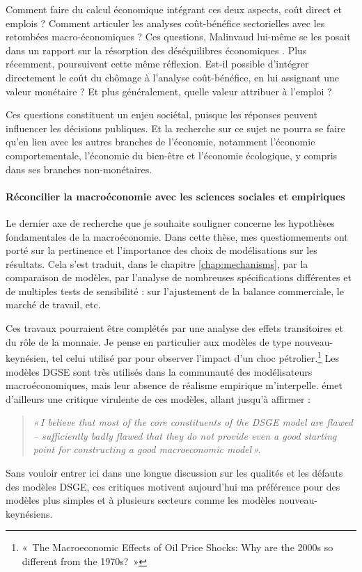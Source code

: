Comment faire du calcul économique intégrant ces deux aspects, coût direct et emplois ? Comment articuler les analyses coût-bénéfice sectorielles avec les retombées macro-économiques ?
Ces questions, Malinvaud lui-même se les posait dans un rapport sur la résorption des déséquilibres économiques \citep{CommissariatgeneralduPlan1984}. Plus récemment, \citet{Masur2011, Masur2012} poursuivent cette même réflexion.
Est-il possible d'intégrer directement le coût du chômage à l'analyse coût-bénéfice, en lui assignant une valeur monétaire ? Et plus généralement, quelle valeur attribuer à l'emploi ? 

Ces questions constituent un enjeu sociétal, puisque les réponses peuvent influencer les décisions publiques. Et la recherche sur ce sujet ne pourra se faire qu'en lien avec les autres branches de l'économie, notamment l'économie comportementale, l'économie du bien-être et l'économie écologique, y compris dans ses branches non-monétaires.

\paragraph{Réconcilier la macroéconomie avec les sciences sociales et empiriques} \hfill

Le dernier axe de recherche que je souhaite souligner concerne les hypothèses fondamentales de la macroéconomie.
Dans cette thèse, mes questionnements ont porté sur la pertinence et l’importance des choix de modélisations sur les résultats. Cela s’est traduit, dans le chapitre \ref{chap:mechanisms}, par la comparaison de modèles, par l’analyse de nombreuses spécifications différentes et de multiples tests de sensibilité : sur l’ajustement de la balance commerciale, le marché de travail, etc. 

Ces travaux pourraient être complétés par une analyse des effets transitoires et du rôle de la monnaie. Je pense en particulier aux modèles de type nouveau-keynésien, tel celui utilisé par \citet{Blanchard2007} pour observer l'impact d'un choc pétrolier.\footnote{«~The Macroeconomic Effects of Oil Price Shocks: Why are the 2000s so different from the 1970s?~»}
Les modèles DGSE sont très utilisés dans la communauté des modélisateurs macroéconomiques, mais leur absence de réalisme empirique m'interpelle. \citet{Stiglitz2008} émet d'ailleurs une critique virulente de ces modèles, allant jusqu'à affirmer : 
\begin{quote}
	\textit{
			«\,I believe that most of the core constituents of the DSGE model are flawed -- sufficiently badly flawed that they do not provide even a good starting point for constructing a good macroeconomic model\,».
	}
\end{quote}
Sans vouloir entrer ici dans une longue discussion sur les qualités et les défauts des modèles DSGE, ces critiques motivent aujourd'hui ma préférence pour des modèles plus simples et à plusieurs secteurs comme les modèles nouveau-keynésiens.

